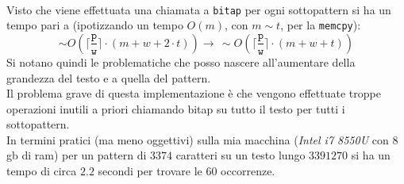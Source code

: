 \documentclass[a4paper,12pt, oneside]{article}
\begin{document}
\\
Visto che viene effettuata una chiamata a \texttt{bitap} per ogni
sottopattern si ha un tempo pari a (ipotizzando un tempo $O(m)$, con
$m\sim t$, per la \texttt{memcpy}):
\[\sim O\left(\Big\lceil
    \frac{\mathtt{p}}{\mathtt{w}}\Big\rceil\cdot (m + w + 2\cdot
    t)\right)\to\,\sim 
  O\left(\Big\lceil \frac{\mathtt{p}}{\mathtt{w}}\Big\rceil\cdot (m + w
    + t)\right)\] 
Si notano quindi le problematiche che posso nascere all'aumentare
della grandezza del testo e a quella del pattern.\\
Il problema grave di questa implementazione è che vengono effettuate
troppe operazioni inutili a priori chiamando bitap su tutto il testo
per tutti i sottopattern.\\
In termini pratici (ma meno oggettivi) sulla mia macchina
(\textit{Intel i7 8550U} con $8$gb di ram) per un pattern di $3374$
caratteri su un testo lungo $3391270$ si ha un tempo di circa $2.2$
secondi per trovare le $60$ occorrenze.
\newpage
\end{document}

